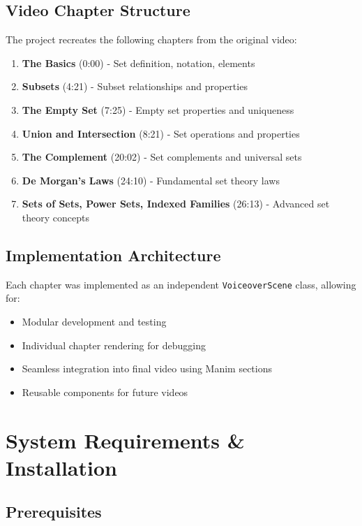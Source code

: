 \documentclass[12pt,a4paper]{article}
\begin{document}
\subsection{Video Chapter Structure}
The project recreates the following chapters from the original video:

\begin{tcolorbox}[colback=gray!5!white,colframe=gray!75!black,title=Video Chapter Structure]
\begin{enumerate}
    \item \textbf{The Basics} (0:00) - Set definition, notation, elements
    \item \textbf{Subsets} (4:21) - Subset relationships and properties
    \item \textbf{The Empty Set} (7:25) - Empty set properties and uniqueness
    \item \textbf{Union and Intersection} (8:21) - Set operations and properties
    \item \textbf{The Complement} (20:02) - Set complements and universal sets
    \item \textbf{De Morgan's Laws} (24:10) - Fundamental set theory laws
    \item \textbf{Sets of Sets, Power Sets, Indexed Families} (26:13) - Advanced set theory concepts
\end{enumerate}
\end{tcolorbox}

\subsection{Implementation Architecture}
Each chapter was implemented as an independent \texttt{VoiceoverScene} class, allowing for:
\begin{itemize}
    \item Modular development and testing
    \item Individual chapter rendering for debugging
    \item Seamless integration into final video using Manim sections
    \item Reusable components for future videos
\end{itemize}

\section{System Requirements \& Installation}

\subsection{Prerequisites}
\end{document}
